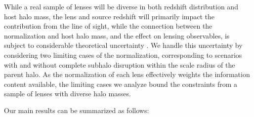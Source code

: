 While a real sample of lenses will be diverse in both redshift distribution and host halo mass, the lens and source redshift will primarily impact the contribution from the line of sight, while the connection between the normalization and host halo mass, and the effect on lensing observables, is subject to considerable theoretical uncertainty \cite{DespVeg16,GK++17}. We handle this uncertainty by considering two limiting cases of the normalization, corresponding to scenarios with and without complete subhalo disruption within the scale radius of the parent halo. As the normalization of each lens effectively weights the information content available, the limiting cases we analyze bound the constraints from a sample of lenses with diverse halo masses.

Our main results can be summarized as follows:

